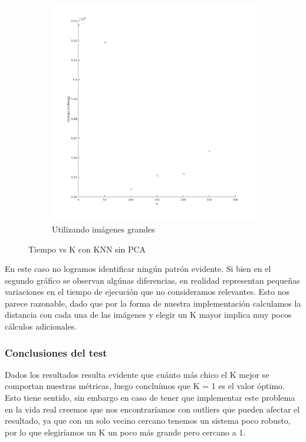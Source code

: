 \begin{figure}[H]
\begin{subfigure}[h]{0.62\linewidth}
\includegraphics[width=\linewidth]{img/big_k_knn_tiempo.png}
\caption{Utilizando imágenes grandes}
\end{subfigure}%
\caption{Tiempo vs K con KNN sin PCA}
\end{figure}


En este caso no logramos identificar ningún patrón evidente. Si bien en el segundo gráfico se observan algúnas diferencias, en realidad representan pequeñas variaciones en el tiempo de ejecución que no consideramos relevantes.
Esto nos parece razonable, dado que por la forma de nuestra implementación calculamos la distancia con cada una de las imágenes y elegir un K mayor implica muy pocos cálculos adicionales.


\subsubsection*{Conclusiones del test}
Dados los resultados resulta evidente que cuánto más chico el K mejor se comportan nuestras métricas, luego concluímos que K = 1 es el valor óptimo.
Esto tiene sentido, sin embargo en caso de tener que implementar este problema en la vida real creemos que nos encontraríamos con outliers que pueden afectar el resultado, ya que con un solo vecino cercano tenemos un sistema poco robusto, por lo que elegiríamos un K un poco más grande pero cercano a 1.

